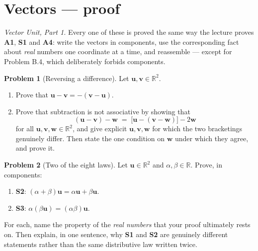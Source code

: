 \documentclass[11pt]{article}
\theoremstyle{definition}
\newtheorem{prob}{Problem}[section]
\newcommand{\R}{\mathbb{R}}
\newcommand{\vc}[1]{\mathbf{#1}}
\begin{document}
\section{Vectors --- proof}
\emph{Vector Unit, Part 1.} Every one of these is proved the same way the
lecture proves \textbf{A1}, \textbf{S1} and \textbf{A4}: write the vectors in
components, use the corresponding fact about \emph{real} numbers one coordinate
at a time, and reassemble --- except for Problem B.4, which deliberately forbids
components.

\begin{prob}[Reversing a difference]
Let $\vc{u},\vc{v}\in\R^{2}$.

\begin{enumerate}[label=\textbf{(\alph*)},leftmargin=2.6em,itemsep=7pt,topsep=6pt]
  \item Prove that $\vc{u}-\vc{v} = -(\vc{v}-\vc{u})$.
  \item Prove that subtraction is not associative by showing that
        \[
          (\vc{u}-\vc{v})-\vc{w}
          \;=\;
          \bigl[\vc{u}-(\vc{v}-\vc{w})\bigr] - 2\vc{w}
        \]
        for all $\vc{u},\vc{v},\vc{w}\in\R^{2}$, and give explicit
        $\vc{u},\vc{v},\vc{w}$ for which the two bracketings genuinely differ.
        Then state the one condition on $\vc{w}$ under which they agree, and
        prove it.
\end{enumerate}
\end{prob}

\begin{prob}[Two of the eight laws]
Let $\vc{u}\in\R^{2}$ and $\alpha,\beta\in\R$. Prove, in components:

\begin{enumerate}[label=\textbf{(\alph*)},leftmargin=2.6em,itemsep=7pt,topsep=6pt]
  \item \textbf{S2}: $(\alpha+\beta)\vc{u} = \alpha\vc{u}+\beta\vc{u}$.
  \item \textbf{S3}: $\alpha(\beta\vc{u}) = (\alpha\beta)\vc{u}$.
\end{enumerate}

\noindent For each, name the property of the \emph{real numbers} that your proof
ultimately rests on. Then explain, in one sentence, why \textbf{S1} and
\textbf{S2} are genuinely different statements rather than the same
distributive law written twice.
\end{prob}
\end{document}
